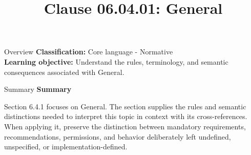 \documentclass[10pt,letterpaper]{article}
\title{Clause 06.04.01: General}
\author{}
\date{}
\begin{document}
\maketitle
\begin{CornellOverviewBox}{Overview}
\textbf{Classification:} Core language - Normative\\[2pt]
\textbf{Learning objective:} Understand the rules, terminology, and semantic consequences associated with General.
\end{CornellOverviewBox}\begin{CornellSummaryBox}{Summary}
{\sffamily\bfseries\color{Accent} Summary}\par\vspace{3pt}Section 6.4.1 focuses on General. The section supplies the rules and semantic distinctions needed to interpret this topic in context with its cross-references. When applying it, preserve the distinction between mandatory requirements, recommendations, permissions, and behavior deliberately left undefined, unspecified, or implementation-defined.
\end{CornellSummaryBox}
\end{document}

